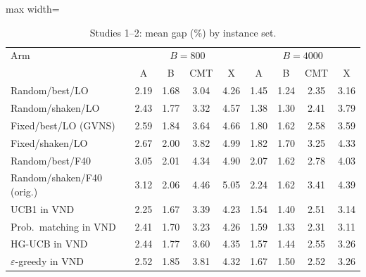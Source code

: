 \begin{table}[h]
\caption{Studies 1--2: mean gap (\%) by instance set.}\label{tab:s2set}
\centering\small
\begin{adjustbox}{max width=\linewidth}
\begin{tabular}{lcccccccc}
\toprule
Arm & \multicolumn{4}{c}{$B=800$} & \multicolumn{4}{c}{$B=4000$} \\
 & A & B & CMT & X & A & B & CMT & X \\
\midrule
Random/best/LO & 2.19 & 1.68 & 3.04 & 4.26 & 1.45 & 1.24 & 2.35 & 3.16 \\
Random/shaken/LO & 2.43 & 1.77 & 3.32 & 4.57 & 1.38 & 1.30 & 2.41 & 3.79 \\
Fixed/best/LO (GVNS) & 2.59 & 1.84 & 3.64 & 4.66 & 1.80 & 1.62 & 2.58 & 3.59 \\
Fixed/shaken/LO & 2.67 & 2.00 & 3.82 & 4.99 & 1.82 & 1.70 & 3.25 & 4.33 \\
Random/best/F40 & 3.05 & 2.01 & 4.34 & 4.90 & 2.07 & 1.62 & 2.78 & 4.03 \\
Random/shaken/F40 (orig.) & 3.12 & 2.06 & 4.46 & 5.05 & 2.24 & 1.62 & 3.41 & 4.39 \\
UCB1 in VND & 2.25 & 1.67 & 3.39 & 4.23 & 1.54 & 1.40 & 2.51 & 3.14 \\
Prob.\ matching in VND & 2.41 & 1.70 & 3.23 & 4.26 & 1.59 & 1.33 & 2.31 & 3.11 \\
HG-UCB in VND & 2.44 & 1.77 & 3.60 & 4.35 & 1.57 & 1.44 & 2.55 & 3.26 \\
$\varepsilon$-greedy in VND & 2.52 & 1.85 & 3.81 & 4.32 & 1.67 & 1.50 & 2.52 & 3.26 \\
\bottomrule
\end{tabular}
\end{adjustbox}
\end{table}
